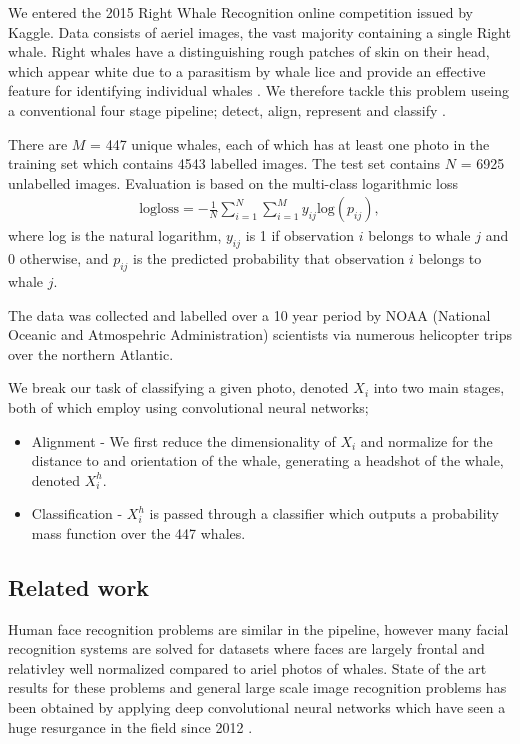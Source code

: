 \documentclass{IET}%
\begin{document}
We entered the 2015 Right Whale Recognition online competition issued by Kaggle. Data consists of aeriel images, the vast majority containing a single Right whale. Right whales have a distinguishing rough patches of skin on their head, which appear white due to a parasitism by whale lice and provide an effective feature for identifying individual whales \cite{kaliszewska2005population}. We therefore tackle this problem useing a conventional four stage pipeline; detect, align, represent and classify \cite{taigman2014deepface}.  

There are $M$ = 447 unique whales, each of which has at least one photo in the training set which contains 4543 labelled images. The test set contains $N$ = 6925 unlabelled images. Evaluation is based on the multi-class logarithmic loss
\begin{eqnarray}
\text{logloss} = - \frac{1}{N} \sum_{i=1}^{N} \sum_{i=1}^{M} y_{ij} \text{log}(p_{ij}),
\end{eqnarray}
where log is the natural logarithm, $y_{ij}$ is 1 if observation $i$ belongs to whale $j$ and 0 otherwise, and $p_{ij}$ is the predicted probability that observation $i$ belongs to whale $j$. 

The data was collected and labelled over a 10 year period by NOAA (National Oceanic and Atmospehric Administration) scientists via numerous helicopter trips over the northern Atlantic. 

We break our task of classifying a given photo, denoted $X_i$ into two main stages, both of which employ using convolutional neural networks;
\begin{itemize}
\item Alignment - We first reduce the dimensionality of $X_i$ and normalize for the distance to and orientation of the whale, generating a headshot of the whale, denoted $X_i^h$.
\item Classification - $X_i^h$ is passed through a classifier which outputs a probability mass function over the 447 whales.
\end{itemize}

\subsection{Related work}
Human face recognition problems are similar in the pipeline, however many facial recognition systems are solved for datasets where faces are largely frontal and relativley well normalized compared to ariel photos of whales. State of the art results for these problems and general large scale image recognition problems has been obtained by applying deep convolutional neural networks which have seen a huge resurgance in the field since 2012 \cite{simonyan2014very,russakovsky2015imagenet,graham2014fractional,mishkin2015all}.
\end{document}
